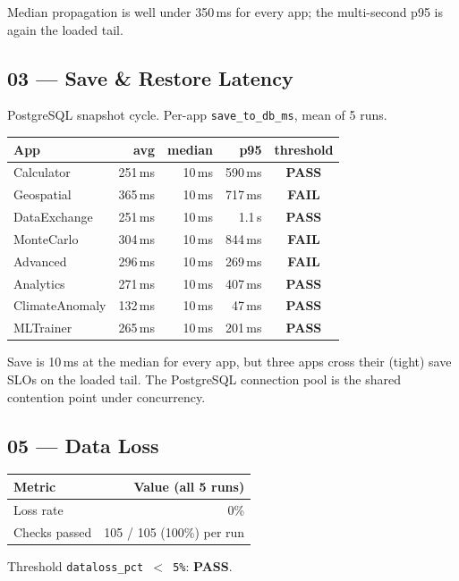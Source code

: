 \documentclass[11pt,a4paper]{article}
\newcommand{\pass}{\textcolor{pass}{\textbf{PASS}}}
\newcommand{\fail}{\textcolor{fail}{\textbf{FAIL}}}
\begin{document}
\medskip
\noindent Median propagation is well under 350\,ms for every app; the
multi-second p95 is again the loaded tail.

\subsection{03 — Save \& Restore Latency}

PostgreSQL snapshot cycle. Per-app \texttt{save\_to\_db\_ms}, mean of 5 runs.

\begin{tabular}{@{}lrrrc@{}}
\toprule
\textbf{App} & \textbf{avg} & \textbf{median} & \textbf{p95} & \textbf{threshold} \\
\midrule
Calculator      & 251\,ms & 10\,ms & 590\,ms & \pass \\
Geospatial      & 365\,ms & 10\,ms & 717\,ms & \fail \\
DataExchange    & 251\,ms & 10\,ms & 1.1\,s  & \pass \\
MonteCarlo      & 304\,ms & 10\,ms & 844\,ms & \fail \\
Advanced        & 296\,ms & 10\,ms & 269\,ms & \fail \\
Analytics       & 271\,ms & 10\,ms & 407\,ms & \pass \\
ClimateAnomaly  & 132\,ms & 10\,ms & 47\,ms  & \pass \\
MLTrainer       & 265\,ms & 10\,ms & 201\,ms & \pass \\
\bottomrule
\end{tabular}

\medskip
\noindent Save is 10\,ms at the median for every app, but three apps cross
their (tight) save SLOs on the loaded tail. The PostgreSQL connection pool is
the shared contention point under concurrency.

\subsection{05 — Data Loss}

\begin{tabular}{@{}lr@{}}
\toprule
\textbf{Metric} & \textbf{Value (all 5 runs)} \\
\midrule
Loss rate     & 0\% \\
Checks passed & 105 / 105 (100\%) per run \\
\bottomrule
\end{tabular}

\medskip\noindent Threshold \texttt{dataloss\_pct $<$ 5\%}: \pass.
\end{document}
